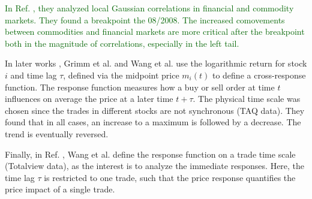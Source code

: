 \textcolor{darkgreen}{In Ref. \cite{referee}, they analyzed local Gaussian
correlations in financial and commodity markets. They found a breakpoint the
08/2008. The increased comovements between commodities and financial markets
are more critical after the breakpoint both in the magnitude of correlations,
especially in the left tail.}

In later works \cite{spread_changes_affect,Wang_2016_cross}, Grimm et al.
and Wang et al. use the logarithmic return for stock $i$ and time lag $\tau$,
defined via the midpoint price $m_{i} \left( t \right)$ to define a
cross-response function. The response function measures how a buy or sell order
at time $t$ influences on average the price at a later time $t + \tau$.
The physical time scale was chosen since the trades in different stocks are not
synchronous (TAQ data). They found that in all cases, an increase  to a
maximum is followed by a decrease. The trend is eventually reversed.

Finally, in Ref. \cite{Wang_2018_b}, Wang et al. define the response function
on a trade time scale (Totalview data), as the interest is to analyze the
immediate responses. Here, the time lag $\tau$ is restricted to one trade, such
that the price response quantifies the price impact of a single trade.
